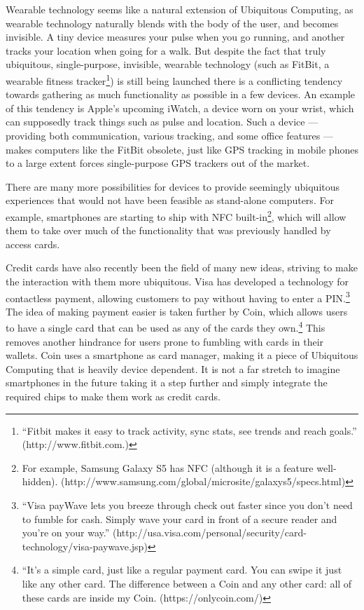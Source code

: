 
Wearable technology seems like a natural extension of Ubiquitous Computing, as wearable technology naturally blends with the body
of the user, and becomes invisible. A tiny device measures your pulse when you go running, and another tracks your location when going for a
walk. But despite the fact that truly ubiquitous,
single-purpose, invisible, wearable technology (such as FitBit, a wearable fitness tracker\footnote{``Fitbit makes it easy to track
activity, sync stats, see trends and reach goals.'' (http://www.fitbit.com.)}) is still being launched there is a conflicting tendency towards gathering as much
functionality as possible in a few devices. An example of this tendency is Apple's upcoming iWatch, a device worn on your wrist, which
can supposedly track things such as pulse and location. Such a device --- providing both communication,
various tracking, and some office features --- makes computers like the FitBit obsolete, just like GPS tracking in mobile phones to a
large extent forces single-purpose GPS trackers out of the market.

There are many more possibilities for devices to provide seemingly ubiquitous experiences that would not have been feasible as stand-alone
computers. For example, smartphones are starting to ship with NFC built-in\footnote{For example, Samsung Galaxy S5 has NFC (although it is
a feature well-hidden). (http://www.samsung.com/global/microsite/galaxys5/specs.html)}, which will allow them to take over much of the
functionality that was previously handled by access cards.

Credit cards have also recently been the field of many new ideas, striving to make the interaction with them more ubiquitous. Visa has developed
a technology for contactless payment, allowing customers to pay without having to enter a PIN.\footnote{``Visa payWave lets you breeze through
check out faster since you don't need to fumble for cash. Simply wave your card in front of a secure reader and you’re on your way.''
(http://usa.visa.com/personal/security/card-technology/visa-paywave.jsp)} The idea of making payment easier is taken further by Coin, which
allows users to have a single card that can be used as any of the cards they own.\footnote{``It's a simple card, just like a regular payment
card. You can swipe it just like any other card. The difference between a Coin and any other card: all of these cards are inside my Coin.
(https://onlycoin.com/)} This removes another hindrance for users prone to fumbling with cards in their wallets. Coin uses a smartphone as card
manager, making it a piece of Ubiquitous Computing that is heavily device dependent. It is not a far stretch to imagine smartphones in the
future taking it a step further and simply integrate the required chips to make them work as credit cards.

